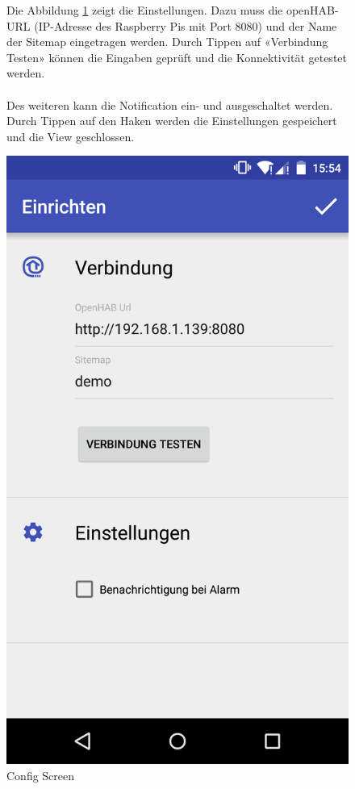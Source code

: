 \begin{figure}[htbp]
	\begin{minipage}{0.6\textwidth} 
Die Abbildung \ref{fig:screenshot_2} zeigt die Einstellungen. Dazu muss die openHAB-URL (IP-Adresse des Raspberry Pis mit Port 8080) und der Name der Sitemap eingetragen werden. Durch Tippen auf «Verbindung Testen» können die Eingaben geprüft und die Konnektivität getestet werden. \\ \\
Des weiteren kann die Notification ein- und ausgeschaltet werden. Durch Tippen auf den Haken werden die Einstellungen gespeichert und die View geschlossen.
	\end{minipage}
	\hfill
	\begin{minipage}{0.32\textwidth}
		\includegraphics[scale=0.12]{appendix/img/AppScreenshots/Screenshot2}
		\caption{Config Screen}
		\label{fig:screenshot_2}
	\end{minipage}
\end{figure}


